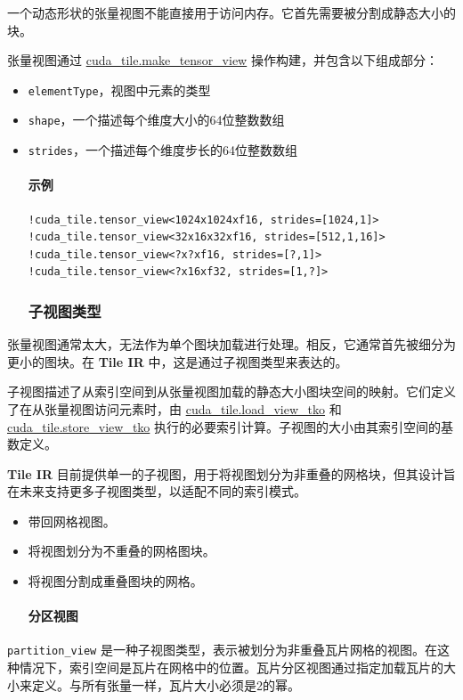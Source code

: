 \documentclass{article}
\begin{document}
一个动态形状的张量视图不能直接用于访问内存。它首先需要被分割成静态大小的块。


张量视图通过 \href{https://docs.nvidia.com/cuda/tile-ir/latest/sections/operations.html#op-cuda-tile-make-tensor-view}{cuda\_tile.make\_tensor\_view} 操作构建，并包含以下组成部分：


\begin{itemize}
\item \texttt{elementType}，视图中元素的类型
\item \texttt{shape}，一个描述每个维度大小的64位整数数组
\item \texttt{strides}，一个描述每个维度步长的64位整数数组

\paragraph{示例}

\begin{lstlisting}
!cuda_tile.tensor_view<1024x1024xf16, strides=[1024,1]>
!cuda_tile.tensor_view<32x16x32xf16, strides=[512,1,16]>
!cuda_tile.tensor_view<?x?xf16, strides=[?,1]>
!cuda_tile.tensor_view<?x16xf32, strides=[1,?]>
\end{lstlisting}


\subsubsection{子视图类型}

\end{itemize}
张量视图通常太大，无法作为单个图块加载进行处理。相反，它通常首先被细分为更小的图块。在 \textbf{Tile IR} 中，这是通过子视图类型来表达的。


子视图描述了从索引空间到从张量视图加载的静态大小图块空间的映射。它们定义了在从张量视图访问元素时，由 \href{https://docs.nvidia.com/cuda/tile-ir/latest/sections/operations.html#op-cuda-tile-load-view-tko}{cuda\_tile.load\_view\_tko} 和 \href{https://docs.nvidia.com/cuda/tile-ir/latest/sections/operations.html#op-cuda-tile-store-view-tko}{cuda\_tile.store\_view\_tko} 执行的必要索引计算。子视图的大小由其索引空间的基数定义。


\textbf{Tile IR} 目前提供单一的子视图，用于将视图划分为非重叠的网格块，但其设计旨在未来支持更多子视图类型，以适配不同的索引模式。

\begin{itemize}
\item 带回网格视图。
\item 将视图划分为不重叠的网格图块。
\item 将视图分割成重叠图块的网格。

\paragraph{分区视图}

\end{itemize}
\texttt{partition\_view} 是一种子视图类型，表示被划分为非重叠瓦片网格的视图。在这种情况下，索引空间是瓦片在网格中的位置。瓦片分区视图通过指定加载瓦片的大小来定义。与所有张量一样，瓦片大小必须是2的幂。
\end{document}
